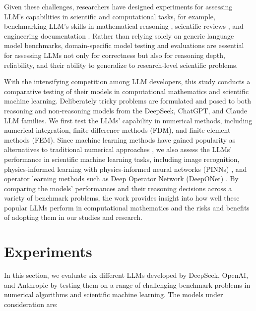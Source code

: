 \documentclass{article}
\begin{document}
Given these challenges, researchers have designed experiments for assessing LLM's capabilities in scientific and computational tasks, for example, benchmarking LLM's skills in mathematical reasoning \cite{liu2024mathbench, chernyshev2024u}, scientific reviews \cite{wu2023gpt, cai2024sciassess}, and engineering documentation \cite{doris2025designqa}. Rather than relying solely on generic language model benchmarks, domain-specific model testing and evaluations are essential for assessing LLMs not only for correctness but also for reasoning depth, reliability, and their ability to generalize to research-level scientific problems. 

With the intensifying competition among LLM developers, this study conducts a comparative testing of their models in computational mathematics and scientific machine learning. Deliberately tricky problems are formulated and posed  to both reasoning and non-reasoning models from the DeepSeek, ChatGPT, and Claude LLM families. We first test the LLMs' capability in numerical methods, including numerical integration, finite difference methods (FDM), and finite element methods (FEM). Since machine learning methods have gained popularity as alternatives to traditional numerical approaches \cite{thiyagalingam2022scientific, karniadakis2021physics}, we also assess the LLMs' performance in scientific machine learning tasks, including image recognition, physics-informed learning with physics-informed neural networks (PINNs) \cite{raissi2019physics}, and operator learning methods such as Deep Operator Network (DeepONet) \cite{deeponet}. By comparing the models' performances and their reasoning decisions across a variety of benchmark problems, the work provides insight into how well these popular LLMs perform in computational mathematics and the risks and benefits of adopting them in our studies and research. 


\section{Experiments}

In this section, we evaluate six different LLMs developed by DeepSeek, OpenAI, and Anthropic by testing them on a range of challenging benchmark problems in numerical algorithms and scientific machine learning. The models under consideration are:
\end{document}
